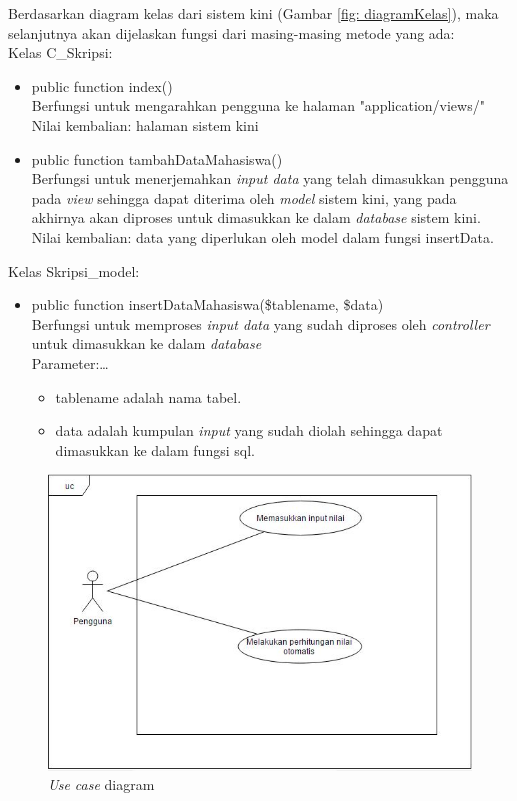 		Berdasarkan diagram kelas dari sistem kini (Gambar \ref{fig: diagramKelas}), maka selanjutnya akan dijelaskan fungsi dari masing-masing metode yang ada:\\
		Kelas C\_Skripsi:
			\begin{itemize}
				\item public function index() \\
				Berfungsi untuk mengarahkan pengguna ke halaman "application/views/"\\
				Nilai kembalian: halaman sistem kini
				\item public function tambahDataMahasiswa() \\
				Berfungsi untuk menerjemahkan \textit{input data} yang telah dimasukkan pengguna pada \textit{view} sehingga dapat diterima oleh \textit{model} sistem kini, yang pada akhirnya akan diproses untuk dimasukkan ke dalam \textit{database} sistem kini.\\
				Nilai kembalian: data yang diperlukan oleh model dalam fungsi insertData.
			\end{itemize}
		Kelas Skripsi\_model:
			\begin{itemize}
				\item public function insertDataMahasiswa(\$tablename, \$data)\\
				Berfungsi untuk memproses \textit{input data} yang sudah diproses oleh \textit{controller} untuk dimasukkan ke dalam \textit{database}\\
				Parameter:\dots{}
					\begin{itemize}
						\item tablename adalah nama tabel.
						\item data adalah kumpulan \textit{input} yang sudah diolah sehingga dapat dimasukkan ke dalam fungsi sql.
					\end{itemize}
			\end{itemize}
		
		\begin{figure}[H]
			\centering
			\includegraphics[scale=1.00]{Gambar/usecase}
			\caption{\textit{Use case} diagram}
			\label{fig: usecase}
		\end{figure}
	
